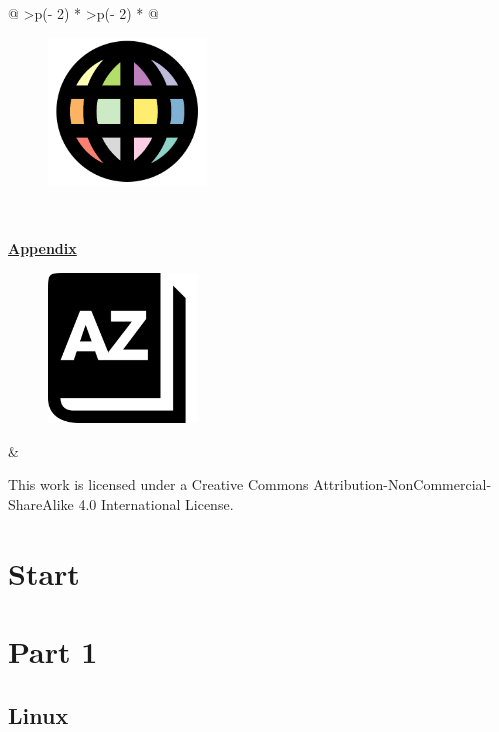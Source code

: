 \documentclass[
  letterpaper,
  DIV=11,
  numbers=noendperiod]{scrreprt}
\begin{document}
\begin{longtable}[]{@{}
  >{\centering\arraybackslash}p{(\columnwidth - 2\tabcolsep) * }
  >{\centering\arraybackslash}p{(\columnwidth - 2\tabcolsep) * }@{}}
\begin{minipage}[t]{\linewidth}
\begin{figure}
{\centering 

\protect\hyperlink{bfxlanguages}{\includegraphics[width=1.65625in,height=\textheight]{figures/languages.png}}

}

\end{figure}
\end{minipage} \\
\begin{minipage}[t]{\linewidth}\centering
\protect\hyperlink{cheatsheet}{\textbf{Appendix}}

\begin{figure}

{\centering 

\protect\hyperlink{cheatsheet}{\includegraphics[width=1.5625in,height=\textheight]{figures/cheatsheet.png}}

}

\end{figure}
\end{minipage} & \\
\end{longtable}

This work is licensed under a Creative Commons
Attribution-NonCommercial-ShareAlike 4.0 International License.

\part{Start}

\part{Part 1}

\hypertarget{linuxintro}{%
\chapter{Linux}\label{linuxintro}}
\end{document}
